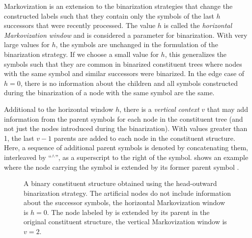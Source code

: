 \documentclass[../../document.tex]{subfiles}
\begin{document}
    Markovization is an extension to the binarization strategies that change the constructed labels such that they contain only the symbols of the last \(h\) successors that were recently processed.
    The value \(h\) is called the \emph{horizontal Markovization window} and is considered a parameter for binarization.
    With very large values for \(h\), the symbols are unchanged in the formulation of the binarization strategy.
    If we choose a small value for \(h\), this generalizes the symbols such that they are common in binarized constituent trees where nodes with the same symbol and similar successors were binarized.
    In the edge case of \(h=0\), there is no information about the children and all symbols constructed during the binarization of a node with the same symbol are the same.

    Additional to the horizontal window \(h\), there is a \emph{vertical context} \(v\) that may add information from the parent symbols for each node in the constituent tree (and not just the nodes introduced during the binarization).
    With values greater than 1, the last \(v-1\) parents are added to each node in the constituent structure.
    Here, a sequence of additional parent symbols is denoted by concatenating them, interleaved by ``$^\wedge$'', as a superscript to the right of the symbol.
     shows an example where the node carrying the symbol  is extended by its former parent symbol .

    \begin{figure}
        \centering
        
        \caption{\label{fig:ex:markovization}
            A binary constituent structure obtained using the head-outward binarization strategy.
            The artificial nodes do not include information about the successor symbols, the horizontal Markovization window is \(h = 0\).
            The node labeled by \label{np} is extended by its parent in the original constituent structure, the vertical Markovization window is \(v = 2\).}
    \end{figure}
\end{document}
